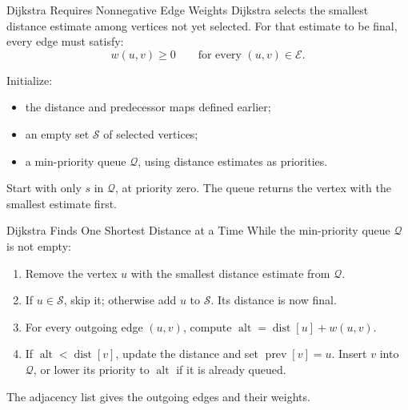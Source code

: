 \documentclass[aspectratio=169,11pt]{beamer}
\begin{document}

\begin{frame}{Dijkstra Requires Nonnegative Edge Weights}
  Dijkstra selects the smallest distance estimate among vertices not yet selected.
  For that estimate to be final, every edge must satisfy:
  \[
    w(u,v)\geq0\qquad\text{for every }(u,v)\in\mathcal E.
  \]

  Initialize:
  \begin{itemize}\setlength{\itemsep}{0.55em}
    \item the distance and predecessor maps defined earlier;
    \item an empty set $\mathcal S$ of selected vertices;
    \item a min-priority queue $\mathcal Q$, using distance estimates as priorities.
  \end{itemize}

  Start with only $s$ in $\mathcal Q$, at priority zero.
  The queue returns the vertex with the smallest estimate first.
\end{frame}

\begin{frame}{Dijkstra Finds One Shortest Distance at a Time}
  While the min-priority queue $\mathcal Q$ is not empty:

  \vspace{0.6em}
  \begin{enumerate}\setlength{\itemsep}{0.65em}
    \item Remove the vertex $u$ with the smallest distance estimate from $\mathcal Q$.
    \item If $u\in\mathcal S$, skip it; otherwise add $u$ to $\mathcal S$.
      Its distance is now final.
    \item For every outgoing edge $(u,v)$, compute
      $\operatorname{alt}=\operatorname{dist}[u]+w(u,v)$.
    \item If $\operatorname{alt}<\operatorname{dist}[v]$, update the distance and
      set $\operatorname{prev}[v]=u$. Insert $v$ into $\mathcal Q$, or lower its
      priority to $\operatorname{alt}$ if it is already queued.
  \end{enumerate}

  The adjacency list gives the outgoing edges and their weights.
\end{frame}
\end{document}
